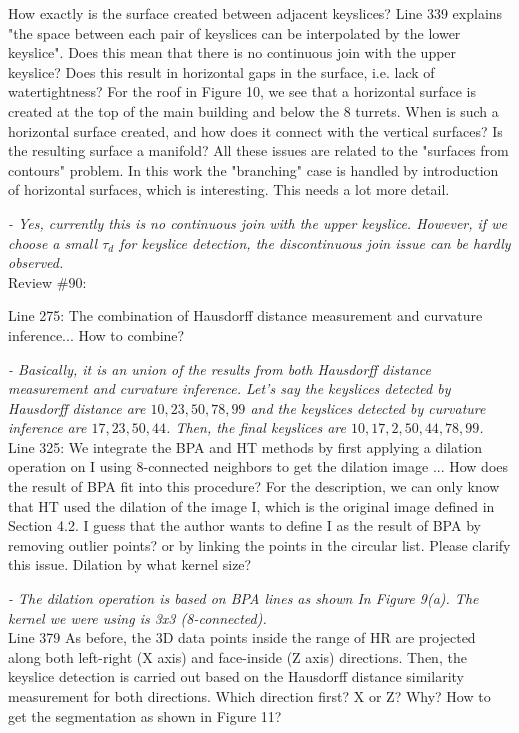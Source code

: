 \documentclass[12pt,letterpaper]{article}
\begin{document}
How exactly is the surface created between adjacent keyslices?
Line 339 explains "the space between each pair of keyslices can be interpolated by the
lower keyslice".
Does this mean that there is no continuous join with the upper keyslice?
Does this result in horizontal gaps in the surface, i.e. lack of watertightness?
For the roof in Figure 10, we see that a horizontal surface is created at the top of
the main building and below the 8 turrets.
When is such a horizontal surface created, and how does it connect with the vertical
surfaces?
Is the resulting surface a manifold?
All these issues are related to the "surfaces from contours" problem. In this work the
"branching" case is handled by introduction of horizontal surfaces, which is
interesting.
This needs a lot more detail. 

{\it - Yes, currently this is no continuous join with the upper keyslice. However,
if we choose a small $\tau_d$ for keyslice detection, the discontinuous join issue
can be hardly observed.}\\


Review \#90:


Line 275: The combination of Hausdorff distance measurement and curvature inference...
How to combine? 

{\it - Basically, it is an union of the results from both Hausdorff distance measurement and 
curvature inference. Let's say the keyslices detected by Hausdorff distance are
 $10, 23, 50, 78, 99$ and the keyslices detected by curvature inference are
$17, 23, 50, 44$. Then, the final keyslices are $10, 17, 2, 50, 44, 78, 99$. }\\


Line 325: We integrate the BPA and HT methods by first applying a dilation operation
on I using 8-connected neighbors to get the dilation image ...
How does the result of BPA fit into this procedure? For the description, we can only
know that HT used the dilation of the image I, which is the original image defined in
Section 4.2. I guess that the author wants to define I as the result of BPA by
removing outlier points? or by linking the points in the circular list. Please clarify
this issue. Dilation by what kernel size? 

{\it - The dilation operation is based on BPA lines as shown In Figure 9(a). The kernel we 
were using is 3x3 (8-connected). }\\


Line 379 As before, the 3D data points inside the range of HR are projected along both
left-right (X axis) and face-inside (Z axis) directions. Then, the keyslice detection
is carried out based on the Hausdorff distance similarity measurement for both
directions.
Which direction first? X or Z? Why? How to get the segmentation as shown in Figure 11? 
\end{document}
